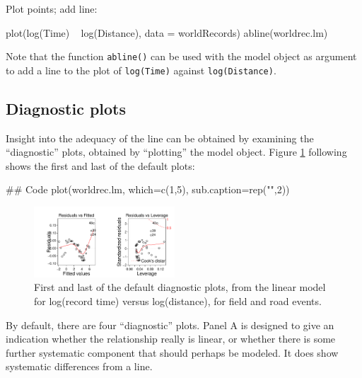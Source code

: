 \documentclass{tufte-book}\usepackage[]{graphicx}\usepackage[]{color}
\newcommand{\txtt}[1]{\texttt{#1}}
\begin{document}
\begin{marginfigure}
Plot points; add line:
\begin{Schunk}
\begin{Sinput}
plot(log(Time) ~ log(Distance),
     data = worldRecords)
abline(worldrec.lm)
\end{Sinput}
\end{Schunk}
\end{marginfigure}
Note that the function \txtt{abline()} can be used
  with the model object as argument to add a line to the plot of
  \txtt{log(Time)} against \txtt{log(Distance)}.

\subsection*{Diagnostic plots}

Insight into the adequacy of the line can be obtained by examining the
``diagnostic'' plots, obtained by ``plotting'' the model object.
Figure \ref{fig:wr-diag} following shows the first and last of the default
plots:
\begin{Schunk}
\begin{Sinput}
## Code
plot(worldrec.lm, which=c(1,5),
     sub.caption=rep("",2))
\end{Sinput}
\end{Schunk}

\begin{figure}
\begin{Schunk}


\centerline{\includegraphics[width=0.47\textwidth]{figs/05-diag12-1} }

\end{Schunk}
      \caption{First and last of the default diagnostic plots, from the
        linear model for log(record time) versus log(distance), for
        field and road events.}
\label{fig:wr-diag}
\end{figure}

By default, there are four ``diagnostic'' plots.  Panel A is designed
to give an indication whether the relationship really is linear, or
whether there is some further systematic component that should perhaps
be modeled.  It does show systematic differences from a line.
\end{document}
